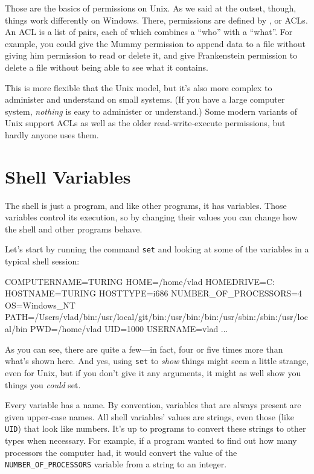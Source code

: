 Those are the basics of permissions on Unix. As we said at the outset,
though, things work differently on Windows. There, permissions are
defined by , or
ACLs. An ACL is a list of pairs, each of which combines a ``who'' with a
``what''. For example, you could give the Mummy permission to append
data to a file without giving him permission to read or delete it, and
give Frankenstein permission to delete a file without being able to see
what it contains.

This is more flexible that the Unix model, but it's also more complex to
administer and understand on small systems. (If you have a large
computer system, \emph{nothing} is easy to administer or understand.)
Some modern variants of Unix support ACLs as well as the older
read-write-execute permissions, but hardly anyone uses them.

\section{Shell Variables}

The shell is just a program, and like other programs, it has variables.
Those variables control its execution, so by changing their values you
can change how the shell and other programs behave.

Let's start by running the command \texttt{set} and looking at some of
the variables in a typical shell session:


\begin{VerbOut}
COMPUTERNAME=TURING
HOME=/home/vlad
HOMEDRIVE=C:
HOSTNAME=TURING
HOSTTYPE=i686
NUMBER_OF_PROCESSORS=4
OS=Windows_NT
PATH=/Users/vlad/bin:/usr/local/git/bin:/usr/bin:/bin:/usr/sbin:/sbin:/usr/local/bin
PWD=/home/vlad
UID=1000
USERNAME=vlad
...
\end{VerbOut}

As you can see, there are quite a few---in fact, four or five times more
than what's shown here. And yes, using \texttt{set} to \emph{show}
things might seem a little strange, even for Unix, but if you don't give
it any arguments, it might as well show you things you \emph{could} set.

Every variable has a name. By convention, variables that are always
present are given upper-case names. All shell variables' values are
strings, even those (like \texttt{UID}) that look like numbers. It's up
to programs to convert these strings to other types when necessary. For
example, if a program wanted to find out how many processors the
computer had, it would convert the value of the
\texttt{NUMBER\_OF\_PROCESSORS} variable from a string to an integer.

